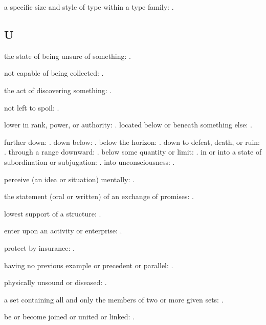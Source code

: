   a specific size and style of type within a type family: .

\subsection*{U}

  the state of being unsure of something: .

  not capable of being collected: .

  the act of discovering something: .

  not left to spoil: .

  lower in rank, power, or authority: . located below or beneath something else: .

  further down: . down below: . below the horizon: . down to defeat, death, or ruin: . through a range downward: . below some quantity or limit: . in or into a state of subordination or subjugation: . into unconsciousness: .

  perceive (an idea or situation) mentally: .

  the statement (oral or written) of an exchange of promises: .

  lowest support of a structure: .

  enter upon an activity or enterprise: .

  protect by insurance: .

  having no previous example or precedent or parallel: .

  physically unsound or diseased: .

  a set containing all and only the members of two or more given sets: .

  be or become joined or united or linked: .

